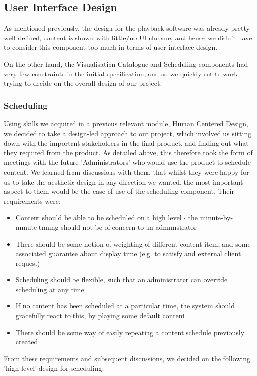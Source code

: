 \documentclass[a4paper, titlepage]{article}
\begin{document}
\subsection{User Interface Design}

As mentioned previously, the design for the playback software was already pretty well defined, content is shown with little/no UI chrome, and hence we didn't have to consider this component too much in terms of user interface design.

On the other hand, the Visualisation Catalogue and Scheduling components had very few constraints in the initial specification, and so we quickly set to work trying to decide on the overall design of our project.

\subsubsection{Scheduling}
Using skills we acquired in a previous relevant module, Human Centered Design, we decided to take a design-led approach to our project, which involved us sitting down with the important stakeholders in the final product, and finding out what they required from the product. As detailed above, this therefore took the form of meetings with the future 'Administrators' who would use the product to schedule content. We learned from discussions with them, that whilst they were happy for us to take the aesthetic design in any direction we wanted, the most important aspect to them would be the ease-of-use of the scheduling component. Their requirements were:
\begin{itemize}
\item Content should be able to be scheduled on a high level - the minute-by-minute timing should not be of concern to an administrator
\item There should be some notion of weighting of different content item, and some associated guarantee about display time (e.g. to satisfy and external client request)
\item Scheduling should be flexible, such that an administrator can override scheduling at any time
\item If no content has been scheduled at a particular time, the system should gracefully react to this, by playing some default content
\item There should be some way of easily repeating a content schedule previously created
\end{itemize}

From these requirements and subsequent discussions, we decided on the following 'high-level' design for scheduling.
\end{document}
